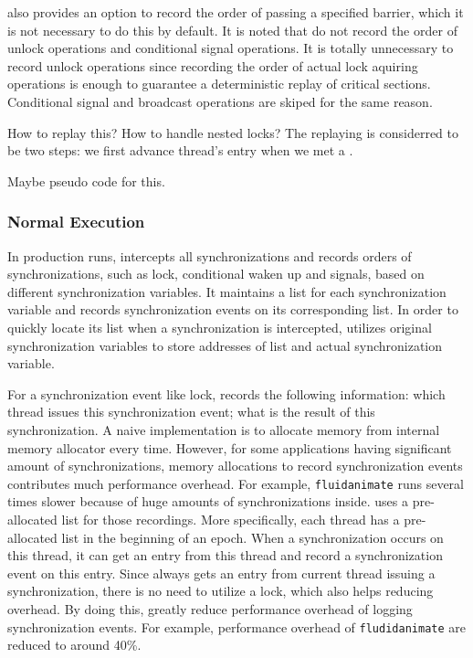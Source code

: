 \doubletake{} also provides an option to record the order of passing a specified barrier, which it is 
not necessary to do this by default.
It is noted that \doubletake{} do not record the order of unlock operations
and conditional signal operations.
It is totally unnecessary to record unlock operations since recording the order of actual 
lock aquiring operations is enough to guarantee a deterministic replay of critical sections.  
Conditional signal and broadcast operations are skiped for the same reason. 

How to replay this?
How to handle nested locks? 
The replaying is considerred to be two steps: we first advance thread's entry when we met a .

Maybe pseudo code for this.
 
\subsubsection{Normal Execution}
In production runs, \doubletake{} intercepts all synchronizations and 
records orders of synchronizations, such as lock, conditional waken up and signals, 
based on different synchronization variables. 
It maintains a list for each synchronization variable and records synchronization
events on its corresponding list. 
In order to quickly locate its list when a synchronization is intercepted, \doubletake{}
utilizes original synchronization variables to store addresses of list and actual synchronization
variable. 

For a synchronization event like lock, \doubletake{} records the following information:
which thread issues this synchronization event; what is the result of this synchronization.
A naive implementation is to allocate memory from internal memory allocator every time. 
However, for some applications having significant amount of synchronizations,
memory allocations to record synchronization events contributes much performance overhead. 
For example, \texttt{fluidanimate} runs several times slower because of huge amounts
of synchronizations inside. \doubletake{} uses a pre-allocated list for those recordings. 
More specifically, each thread has a pre-allocated list in the beginning of an epoch. 
When a synchronization occurs on this thread, it can get an entry from this thread and 
record a synchronization event on this entry.
Since \doubletake{} always gets an entry from current thread issuing a synchronization,
there is no need to utilize a lock, which also helps reducing overhead. 
By doing this, \doubletake{} greatly reduce performance overhead of logging synchronization
events. For example, performance overhead of \texttt{fludidanimate} are reduced to around 40\%.

